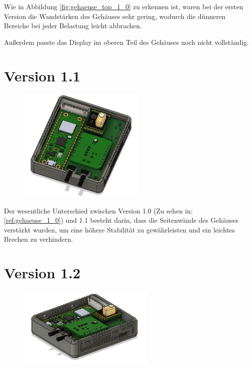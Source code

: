 \begin{inhalt}
Wie in Abbildung \ref{fig:gehaeuse_top_1_0} zu erkennen ist, waren bei der ersten Version die Wandstärken des Gehäuses sehr gering, wodurch die dünneren Bereiche bei jeder Belastung leicht abbrachen.



\vspace{0.15cm}

Außerdem passte das Display im oberen Teil des Gehäuses noch nicht vollständig.

\newpage

\section{Version 1.1}

\begin{figure}[!htb]
\centering
\includegraphics[width=0.55\textwidth]{files/Thomas/pics/geheause/1.1/gehaeuse_top.png}
\caption[Bildbezeichnung für Abbildungsverzeichnis]{}
\label{fig:gehaeuse_internet_bild}
\end{figure}

Der wesentliche Unterschied zwischen Version 1.0 (Zu sehen in: \ref{ref:gehaeuse_1_0}) und 1.1 besteht darin, dass die Seitenwände des Gehäuses verstärkt wurden, um eine höhere Stabilität zu gewährleisten und ein leichtes Brechen zu verhindern.

\newpage

\section{Version 1.2}

\begin{figure}[!htb]
\centering
\includegraphics[width=0.6\textwidth]{files/Thomas/pics/geheause/1.2/gehaeuse_side.png}
\caption[Bildbezeichnung für Abbildungsverzeichnis]{}
\label{fig:gehaeuse_internet_bild}
\end{figure}


\end{inhalt}
